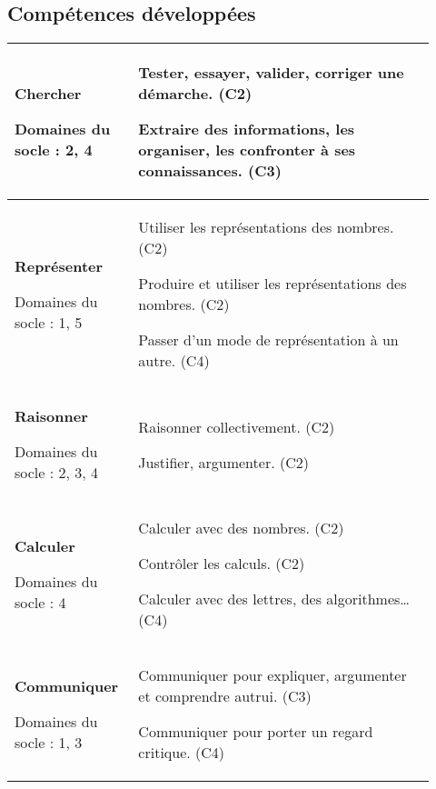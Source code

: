 \subsection{Compétences développées}
\begin{center}
  \renewcommand{\arraystretch}{1.5}
{\footnotesize
\begin{tabular}{|m{0.25\linewidth}|m{0.67\linewidth}|}
    \hline
    {\textbf{Chercher}\par Domaines du socle : 2, 4}
    & {Tester, essayer, valider, corriger une démarche. (C2)\par
    Extraire des informations, les organiser, les confronter à ses connaissances. (C3)}\\
    \hline
    {\textbf{Représenter}\par Domaines du socle : 1, 5}
    & {Utiliser les représentations des nombres. (C2)\par 
    Produire et utiliser les représentations des nombres. (C2)\par 
    Passer d’un mode de représentation à un autre. (C4)
    }\\
    \hline
    {\textbf{Raisonner}\par Domaines du socle : 2, 3, 4}
    & {Raisonner collectivement. (C2)\par 
    Justifier, argumenter. (C2)
    }\\
    \hline
    {\textbf{Calculer}\par Domaines du socle : 4}
    & {Calculer avec des nombres. (C2)\par 
    Contrôler les calculs. (C2)\par 
    Calculer avec des lettres, des algorithmes\dots{} (C4)
    }\\
    \hline
    {\textbf{Communiquer}\par Domaines du socle : 1, 3}
    & {Communiquer pour expliquer, argumenter et comprendre autrui. (C3)\par
    Communiquer pour porter un regard critique. (C4)
    }\\
    \hline
\end{tabular}
}
\renewcommand{\arraystretch}{1}
\end{center}

